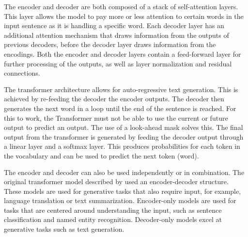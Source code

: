 The encoder and decoder are both composed of a stack of self-attention layers. This layer allows the model to pay more or less attention to certain words in the input sentence as it is handling a specific word. Each decoder layer has an additional attention mechanism that draws information from the outputs of previous decoders, before the decoder layer draws information from the encodings. Both the encoder and decoder layers contain a feed-forward layer for further processing of the outputs, as well as layer normalization and residual connections.

The transformer architecture allows for auto-regressive text generation. This is achieved by re-feeding the decoder the encoder outputs. The decoder then generates the next word in a loop until the end of the sentence is reached. For this to work, the  Transformer must not be able to use the current or future output to predict an output. The use of a look-ahead mask solves this. The final output from the transformer is generated by feeding the decoder output through a linear layer and a softmax layer. This produces probabilities for each token in the vocabulary and can be used to predict the next token (word).

The encoder and decoder can also be used independently or in combination. The original transformer model described by \textcite{vaswani2017attention} used an encoder-decoder structure. These models are used for generative tasks that also require input, for example, language translation or text summarization. Encoder-only models are used for tasks that are centered around understanding the input, such as sentence classification and named entity recognition. Decoder-only models excel at generative tasks such as text generation.

